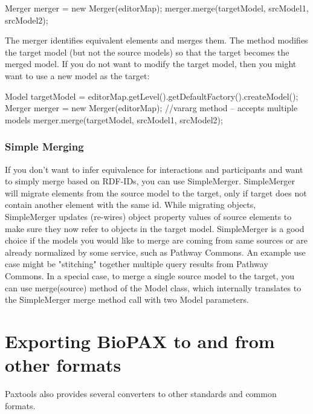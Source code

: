 \documentclass{tufte-book}
\begin{document}
\begin{javacode}
  Merger merger = new Merger(editorMap);
   merger.merge(targetModel, srcModel1, srcModel2);
\end{javacode}

The merger identifies equivalent elements and merges them. The method modifies the target model (but not the source models) so that the target becomes the merged model. If you do not want to modify the target model, then you might want to use a new model as the target:

\begin{javacode}
  Model targetModel = 
   editorMap.getLevel().getDefaultFactory().createModel();
  Merger merger = new Merger(editorMap);
//vararg method – accepts multiple models
  merger.merge(targetModel, srcModel1, srcModel2); 
\end{javacode}

\subsection{Simple Merging}
If you don't want to infer equivalence for interactions and participants and want to simply merge based on RDF-IDs, you can use SimpleMerger.  SimpleMerger will migrate elements from the source model to the target, only if target does not contain another element with the same id.  While migrating objects, SimpleMerger updates (re-wires) object property values of source elements to make sure they now refer to objects in the target model. SimpleMerger is a good choice if the models you would like to merge are coming from same sources or are already normalized by some service, such as Pathway Commons. An example use case might be "stitching" together multiple query results from Pathway Commons. 
In a special case, to merge a single source model to the target, you can use merge(source) method of the Model class, which internally translates to the SimpleMerger merge method call with two Model parameters.

\chapter{Exporting BioPAX to and from other formats}

Paxtools also provides several converters to other standards and common formats. 
\end{document}
